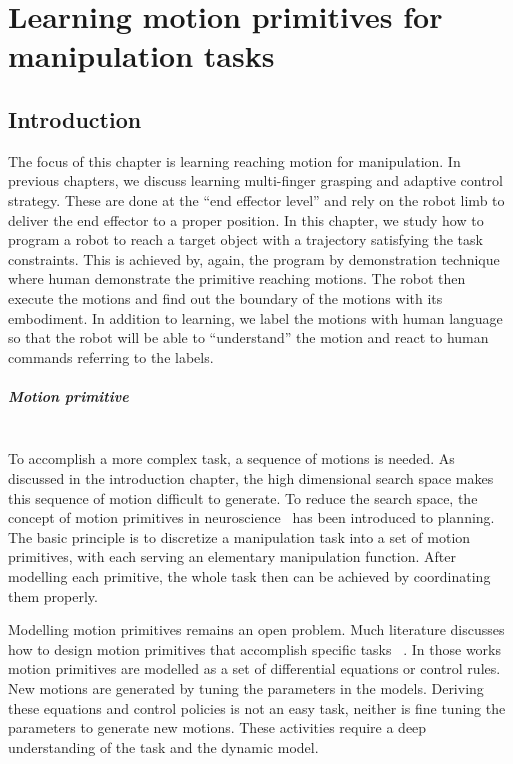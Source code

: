 \chapter{Learning motion primitives for manipulation tasks}
\label{cha5}

\section{Introduction}
\label{cha5:sec1}
The focus of this chapter is learning reaching motion for manipulation. In previous chapters, we discuss learning multi-finger grasping and adaptive control strategy. These are done at the ``end effector level'' and rely on the robot limb to deliver the end effector to a proper position. In this chapter, we study how to program a robot to reach a target object with a trajectory satisfying the task constraints. This is achieved by, again, the program by demonstration technique where human demonstrate the primitive reaching motions. The robot then execute the motions and find out the boundary of the motions with its embodiment.
In addition to learning, we label the motions with human language so that the robot will be able to ``understand'' the motion and react to human commands referring to the labels.

\paragraph{Motion primitive} ~\\
To accomplish a more complex task, a sequence of motions is needed. As discussed in the introduction chapter, the high dimensional search space makes this sequence of motion difficult to generate. To reduce the search space, the concept of motion primitives in neuroscience~\citep{bizzi2008combining} has been introduced to planning. The basic principle is to discretize a manipulation task into a set of motion primitives, with each serving an elementary manipulation function. After modelling each primitive, the whole task then can be achieved by coordinating them properly.

Modelling motion primitives remains an open problem. Much literature discusses how to design motion primitives that accomplish specific tasks ~\citep{michelman1994forming,felip2012manipulation,ijspeert2013dynamical}. In those works motion primitives are modelled as a set of differential equations or control rules. New motions are generated by tuning the parameters in the models. Deriving these equations and control policies is not an easy task, neither is fine tuning the parameters to generate new motions. These activities require a deep understanding of the task and the dynamic model.

